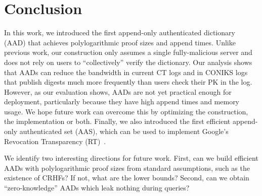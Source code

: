 \section{Conclusion}
In this work, we introduced the first append-only authenticated dictionary (AAD) that achieves polylogarithmic proof sizes and append times.
Unlike previous work, our construction only assumes a single fully-malicious server and does not rely on users to ``collectively'' verify the dictionary.
Our analysis shows that AADs can reduce the bandwidth in current CT logs and in CONIKS logs that publish digests much more frequently than users check their PK in the log.
However, as our evaluation shows, AADs are not yet practical enough for deployment, particularly because they have high append times and memory usage.
We hope future work can overcome this by optimizing the construction, the implementation or both.
Finally, we also introduced the first efficient append-only authenticated set (AAS), which can be used to implement Google's Revocation Transparency (RT)~\cite{rev-transparency}.

We identify two interesting directions for future work.
First, can we build efficient AADs with polylogarithmic proof sizes from standard assumptions, such as the existence of CRHFs?
If not, what are the lower bounds?
Second, can we obtain ``zero-knowledge'' AADs which leak nothing during queries?
